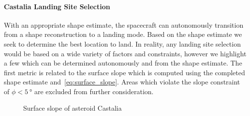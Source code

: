\documentclass[letterpaper, paper,11pt]{AAS}		%
\begin{document}
\paragraph{Castalia Landing Site Selection}

With an appropriate shape estimate, the spacecraft can autonomously transition from a shape reconstruction to a landing mode.
Based on the shape estimate we seek to determine the best location to land. 
In reality, any landing site selection would be based on a wide variety of factors and constraints, however we highlight a few which can be determined autonomously and from the shape estimate.
The first metric is related to the surface slope which is computed using the completed shape estimate and~\cref{eq:surface_slope}.
Areas which violate the slope constraint of \( \phi < \SI{5}{\degree} \) are excluded from further consideration.
\begin{figure}[htbp]
    \centering
    \caption{Surface slope of asteroid Castalia\label{fig:surface_slope_castalia_both}}
\end{figure}
\end{document}

